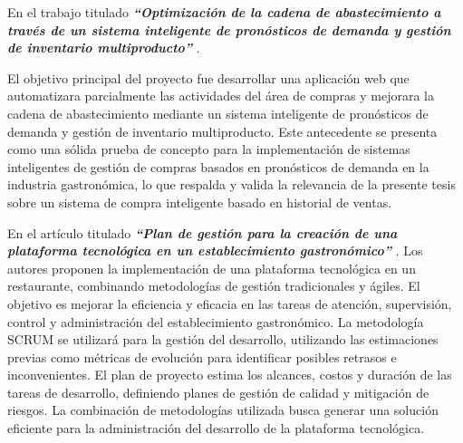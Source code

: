 \vspace{1\baselineskip}
En el trabajo titulado \textbf{\textit{ “Optimización de la cadena de abastecimiento a través de un sistema inteligente de pronósticos de demanda y gestión de inventario multiproducto”}} \cite{pacheco2015rediseno}. 

El objetivo principal del proyecto fue desarrollar una aplicación web que automatizara parcialmente las actividades del área de compras y mejorara la cadena de abastecimiento mediante un sistema inteligente de pronósticos de demanda y gestión de inventario multiproducto. 
Este antecedente se presenta como una sólida prueba de concepto para la implementación de sistemas inteligentes de gestión de compras basados en pronósticos de demanda en la industria gastronómica, lo que respalda y valida la relevancia de la presente tesis sobre un sistema de compra inteligente basado en historial de ventas.



\vspace{1\baselineskip}
En el artículo titulado  \textbf{\textit{“Plan de gestión para la creación de una plataforma tecnológica en un establecimiento gastronómico” }}\cite{sanchez2018sistemas}. Los autores proponen la implementación de una plataforma tecnológica en un restaurante, combinando metodologías de gestión tradicionales y ágiles. El objetivo es mejorar la eficiencia y eficacia en las tareas de atención, supervisión, control y administración del establecimiento gastronómico. La metodología SCRUM se utilizará para la gestión del desarrollo, utilizando las estimaciones previas como métricas de evolución para identificar posibles retrasos e inconvenientes. El plan de proyecto estima los alcances, costos y duración de las tareas de desarrollo, definiendo planes de gestión de calidad y mitigación de riesgos. La combinación de metodologías utilizada busca generar una solución eficiente para la administración del desarrollo de la plataforma tecnológica. 

